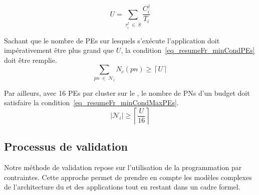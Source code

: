 \documentclass[main.tex]{subfiles}
\begin{document}
\begin{description}
\begin{displaymath}
    U = \underset{\tau_i^j \; \in \; S}{\sum} \dfrac{C_i^j}{T_i}
\end{displaymath}

        Sachant que le nombre de PEs sur lesquels s'exécute l'application doit impérativement être plus grand que $U$, la condition~\ref{eq_resumeFr_minCondPEs} doit être remplie.
\begin{equation}
    \underset{pn \; \in \; \mathcal{N}_i}{\sum} N_c(pn) \geq \left\lceil U \right\rceil
    \label{eq_resumeFr_minCondPEs}
\end{equation}

        Par ailleurs, avec 16 PEs par cluster sur le \mppalong, le nombre de PNs d'un budget doit satisfaire la condition~\ref{eq_resumeFr_minCondMaxPEs}.
\begin{equation}
    | \mathcal{N}_i | \geq \left\lceil \dfrac{U}{16} \right\rceil
    \label{eq_resumeFr_minCondMaxPEs}
\end{equation}

\end{description}

\subsection{Processus de validation}
Notre méthode de validation repose sur l'utilisation de la programmation par contraintes. Cette approche permet de prendre en compte les modèles complexes de l'architecture du \mppalong et des applications tout en restant dans un cadre formel.
\end{document}

